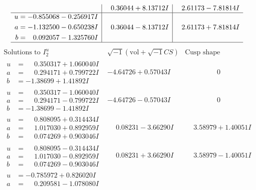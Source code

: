 \documentclass[1p]{elsarticle_modified}
\theoremstyle{definition}
\newcommand{\I}{\sqrt{-1}}
\begin{document}
$$\begin{array}{c|c|c}
 & \phantom{-}0.36044 + 8.13712 I & \phantom{-}2.61173 - 7.81814 I \\ \hline\begin{aligned}
u &= -0.855068 - 0.256917 I \\
a &= -1.132500 - 0.650238 I \\
b &= \phantom{-}0.092057 - 1.325760 I\end{aligned}
 & \phantom{-}0.36044 - 8.13712 I & \phantom{-}2.61173 + 7.81814 I\\
 \hline 
 \end{array}$$\newpage$$\begin{array}{c|c|c}  
\text{Solutions to }I^u_{2}& \I (\text{vol} + \sqrt{-1}CS) & \text{Cusp shape}\\
 \hline 
\begin{aligned}
u &= \phantom{-}0.350317 + 1.060040 I \\
a &= \phantom{-}0.294171 + 0.799722 I \\
b &= -1.38699 + 1.41892 I\end{aligned}
 & -4.64726 + 0.57043 I & \phantom{-0.000000 } 0 \\ \hline\begin{aligned}
u &= \phantom{-}0.350317 - 1.060040 I \\
a &= \phantom{-}0.294171 - 0.799722 I \\
b &= -1.38699 - 1.41892 I\end{aligned}
 & -4.64726 - 0.57043 I & \phantom{-0.000000 } 0 \\ \hline\begin{aligned}
u &= \phantom{-}0.808095 + 0.314434 I \\
a &= \phantom{-}1.017030 + 0.892959 I \\
b &= \phantom{-}0.074269 + 0.903046 I\end{aligned}
 & \phantom{-}0.08231 - 3.66290 I & \phantom{-}3.58979 + 1.40051 I \\ \hline\begin{aligned}
u &= \phantom{-}0.808095 - 0.314434 I \\
a &= \phantom{-}1.017030 - 0.892959 I \\
b &= \phantom{-}0.074269 - 0.903046 I\end{aligned}
 & \phantom{-}0.08231 + 3.66290 I & \phantom{-}3.58979 - 1.40051 I \\ \hline\begin{aligned}
u &= -0.785972 + 0.826020 I \\
a &= \phantom{-}0.209581 - 1.078080 I \\

\end{aligned}
\end{array}$$
\end{document}
